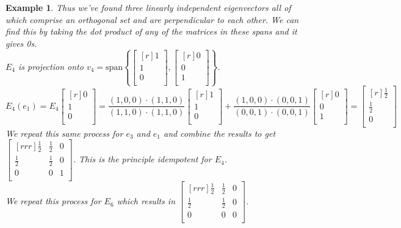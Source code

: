 \documentclass{report}
\newtheorem*{ex}{Example}
\begin{document}
\begin{ex}
Thus we've found three linearly independent eigenvectors all of which comprise an orthogonal set and are perpendicular to each other. We can find this by taking the dot product of any of the matrices in these spans and it gives 0s.\\
$E_4$ is projection onto $v_4 = \mathrm{span}\left\{\begin{bmatrix}[r]1\\1\\0\\\end{bmatrix},\begin{bmatrix}[r]0\\0\\1\\\end{bmatrix}\right\}$.\\
\[ E_4(e_1) = E_4\begin{bmatrix}[r]0\\1\\0\\\end{bmatrix} = \dfrac{(1,0,0)\cdot (1,1,0)}{(1,1,0)\cdot (1,1,0)}\begin{bmatrix}[r]1\\1\\0\\\end{bmatrix} + \dfrac{(1,0,0)\cdot (0,0,1)}{(0,0,1)\cdot (0,0,1)}\begin{bmatrix}[r]0\\0\\1\\\end{bmatrix} =\begin{bmatrix}[r]\frac{1}{2}\\\frac{1}{2}\\0\\\end{bmatrix} \]
We repeat this same process for $e_3$ and $e_1$ and combine the results to get $\begin{bmatrix}[rrr]\frac{1}{2}&\frac{1}{2}&0\\\frac{1}{2}&\frac{1}{2}&0\\0&0&1\\\end{bmatrix}$. This is the principle idempotent for $E_4$.\\
We repeat this process for $E_6$ which results in $\begin{bmatrix}[rrr]\frac{1}{2}&\frac{1}{2}&0\\\frac{1}{2}&\frac{1}{2}&0\\0&0&0\\\end{bmatrix}$.\\

\end{ex}
\end{document}
